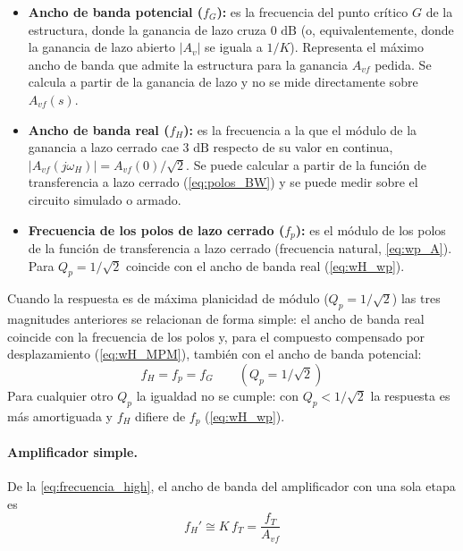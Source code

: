 \begin{itemize}
    \item \textbf{Ancho de banda potencial ($f_G$):} es la frecuencia del punto crítico $G$ de la estructura, donde la ganancia de lazo cruza $0\text{ dB}$ (o, equivalentemente, donde la ganancia de lazo abierto $|A_v|$ se iguala a $1/K$). Representa el máximo ancho de banda que admite la estructura para la ganancia $A_{vf}$ pedida. Se calcula a partir de la ganancia de lazo y no se mide directamente sobre $A_{vf}(s)$.
    \item \textbf{Ancho de banda real ($f_H$):} es la frecuencia a la que el módulo de la ganancia a lazo cerrado cae $3\text{ dB}$ respecto de su valor en continua, $|A_{vf}(j\omega_H)| = A_{vf}(0)/\sqrt{2}$. Se puede calcular a partir de la función de transferencia a lazo cerrado (\autoref{eq:polos_BW}) y se puede medir sobre el circuito simulado o armado.
    \item \textbf{Frecuencia de los polos de lazo cerrado ($f_p$):} es el módulo de los polos de la función de transferencia a lazo cerrado (frecuencia natural, \autoref{eq:wp_A}). Para $Q_p = 1/\sqrt{2}$ coincide con el ancho de banda real (\autoref{eq:wH_wp}).
\end{itemize}

Cuando la respuesta es de máxima planicidad de módulo ($Q_p = 1/\sqrt{2}$) las tres magnitudes anteriores se relacionan de forma simple: el ancho de banda real coincide con la frecuencia de los polos y, para el compuesto compensado por desplazamiento (\autoref{eq:wH_MPM}), también con el ancho de banda potencial:
\begin{equation}
    f_H = f_p = f_G \qquad (Q_p = 1/\sqrt{2})
    \label{eq:fH_fp_MPM}
\end{equation}
Para cualquier otro $Q_p$ la igualdad no se cumple: con $Q_p<1/\sqrt{2}$ la respuesta es más amortiguada y $f_H$ difiere de $f_p$ (\autoref{eq:wH_wp}).

\paragraph{Amplificador simple.} De la \autoref{eq:frecuencia_high}, el ancho de banda del amplificador con una sola etapa es
\begin{equation}
    f_H' \cong K\, f_T = \frac{f_T}{A_{vf}}
    \label{eq:bw_simple}
\end{equation}

